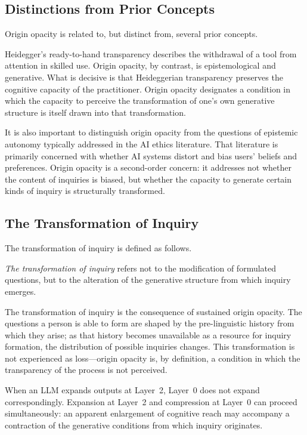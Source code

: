 \documentclass[12pt]{article}
\begin{document}
\subsection{Distinctions from Prior Concepts}

Origin opacity is related to, but distinct from, several prior concepts.

Heidegger's ready-to-hand transparency describes the withdrawal of a tool from attention in skilled use. Origin opacity, by contrast, is epistemological and generative. What is decisive is that Heideggerian transparency preserves the cognitive capacity of the practitioner. Origin opacity designates a condition in which the capacity to perceive the transformation of one's own generative structure is itself drawn into that transformation.

It is also important to distinguish origin opacity from the questions of epistemic autonomy typically addressed in the AI ethics literature. That literature is primarily concerned with whether AI systems distort and bias users' beliefs and preferences. Origin opacity is a second-order concern: it addresses not whether the content of inquiries is biased, but whether the capacity to generate certain kinds of inquiry is structurally transformed.

\subsection{The Transformation of Inquiry}

The transformation of inquiry is defined as follows.

\emph{The transformation of inquiry} refers not to the modification of formulated questions, but to the alteration of the generative structure from which inquiry emerges.

The transformation of inquiry is the consequence of sustained origin opacity. The questions a person is able to form are shaped by the pre-linguistic history from which they arise; as that history becomes unavailable as a resource for inquiry formation, the distribution of possible inquiries changes. This transformation is not experienced as loss---origin opacity is, by definition, a condition in which the transparency of the process is not perceived.

When an LLM expands outputs at Layer~2, Layer~0 does not expand correspondingly. Expansion at Layer~2 and compression at Layer~0 can proceed simultaneously: an apparent enlargement of cognitive reach may accompany a contraction of the generative conditions from which inquiry originates.
\end{document}
